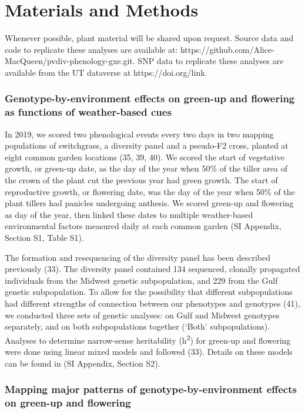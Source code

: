 \documentclass[
  9pt,
  twocolumn,
  twoside]{pnas-new}
\begin{document}
\section{Materials and Methods}\label{materials-and-methods}

Whenever possible, plant material will be shared upon request. Source
data and code to replicate these analyses are available at:
https://github.com/Alice-MacQueen/pvdiv-phenology-gxe.git. SNP data to
replicate these analyses are available from the UT dataverse at
https://doi.org/link.

\subsubsection{Genotype-by-environment effects on green-up and flowering
as functions of weather-based
cues}\label{genotype-by-environment-effects-on-green-up-and-flowering-as-functions-of-weather-based-cues}

In 2019, we scored two phenological events every two days in two mapping
populations of switchgrass, a diversity panel and a pseudo-F2 cross,
planted at eight common garden locations (35, 39, 40). We scored the
start of vegetative growth, or green-up date, as the day of the year
when 50\% of the tiller area of the crown of the plant cut the previous
year had green growth. The start of reproductive growth, or flowering
date, was the day of the year when 50\% of the plant tillers had
panicles undergoing anthesis. We scored green-up and flowering as day of
the year, then linked these dates to multiple weather-based
environmental factors measured daily at each common garden (SI Appendix,
Section S1, Table S1).

The formation and resequencing of the diversity panel has been described
previously (33). The diversity panel contained 134 sequenced, clonally
propagated individuals from the Midwest genetic subpopulation, and 229
from the Gulf genetic subpopulation. To allow for the possibility that
different subpopulations had different strengths of connection between
our phenotypes and genotypes (41), we conducted three sets of genetic
analyses: on Gulf and Midwest genotypes separately, and on both
subpopulations together (`Both' subpopulations). Analyses to determine
narrow-sense heritability (h\textsuperscript{2}) for green-up and
flowering were done using linear mixed models and followed (33). Details
on these models can be found in (SI Appendix, Section S2).

\subsubsection{Mapping major patterns of genotype-by-environment effects
on green-up and
flowering}\label{mapping-major-patterns-of-genotype-by-environment-effects-on-green-up-and-flowering}
\end{document}
